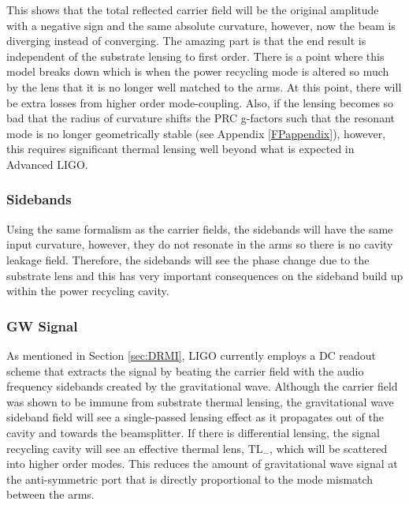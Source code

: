 		This shows that the total reflected carrier field will be the original amplitude with a negative sign and the same absolute curvature, however, now the beam is diverging instead of converging.  The amazing part is that the end result is independent of the substrate lensing to first order.  There is a point where this model breaks down which is when the power recycling mode is altered so much by the lens that it is no longer well matched to the arms.  At this point, there will be extra losses from higher order mode-coupling.  Also, if the lensing becomes so bad that the radius of curvature shifts the PRC g-factors such that the resonant mode is no longer geometrically stable (see Appendix \ref{FPappendix}), however, this requires significant thermal lensing well beyond what is expected in Advanced LIGO.
		
		\subsubsection{Sidebands}
		Using the same formalism as the carrier fields, the sidebands will have the same input curvature, however, they do not resonate in the arms so there is no cavity leakage field.  Therefore, the sidebands will see the phase change due to the substrate lens and this has very important consequences on the sideband build up within the power recycling cavity.
		
		\subsubsection{GW Signal}
		As mentioned in Section \ref{sec:DRMI}, LIGO currently employs a DC readout scheme that extracts the signal by beating the carrier field with the audio frequency sidebands created by the gravitational wave.  Although the carrier field was shown to be immune from substrate thermal lensing, the gravitational wave sideband field will see a single-passed lensing effect as it propagates out of the cavity and towards the beamsplitter.  If there is differential lensing, the signal recycling cavity will see an effective thermal lens, $\text{TL}_{-}$, which will be scattered into higher order modes.  This reduces the amount of gravitational wave signal at the anti-symmetric port that is directly proportional to the mode mismatch between the arms.
	
